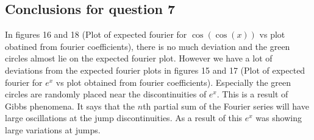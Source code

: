 \documentclass[12pt, a4paper]{article}
\begin{document}
\begin{enumerate}[label=\alph*.]
\subsection{Conclusions for question 7}
In figures 16 and 18 (Plot of expected fourier for $\cos(\cos(x))$ vs plot obatined from fourier coefficients), there is no much deviation and the green circles almost lie on the expected fourier plot. However we have a lot of deviations from the expected fourier plots in figures 15 and 17 (Plot of expected fourier for $e^{x}$ vs plot obtained from fourier coefficients). Especially the green circles are randomly placed near the discontinuities of $e^{x}$.
This is a result of Gibbs phenomena. It says that the $n$th partial sum of the Fourier series will have large oscillations at the jump discontinuities. As a result of this $e^{x}$ was showing large variations at jumps.

\end{enumerate}
\end{document}

